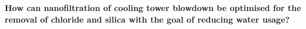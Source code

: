 \textbf{How can nanofiltration of cooling tower blowdown  be optimised for the removal of chloride and silica with the goal of reducing water usage?}













